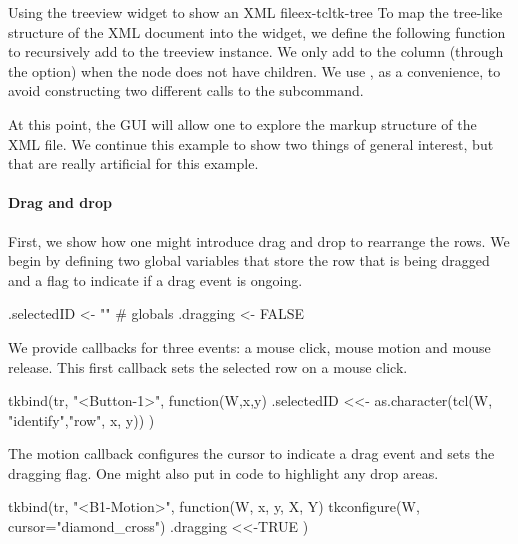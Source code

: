 \begin{example}{Using the treeview widget to show an XML file}{ex-tcltk-tree}
To map the tree-like structure of the XML document into the widget, we
define the following function to recursively add to the treeview
instance.  We only add to the  column (through the
 option) when the node does not have children. We use
, as a convenience, to avoid constructing two different
calls to the  subcommand. 
\begin{Schunk}
\end{Schunk}
%
At this point, the GUI will allow one to explore the markup structure of the
XML file. We continue this example to show two things of general
interest, but that are really artificial for this example.


\paragraph{Drag and drop}
First, we show how one might introduce drag and drop to rearrange the
rows. We begin by defining two global variables that store the row
that is being dragged  and a flag to indicate if a drag event is ongoing.
\begin{Schunk}
\begin{Sinput}
 .selectedID <- ""                               # globals
 .dragging <- FALSE
\end{Sinput}
\end{Schunk}
We provide callbacks for three events: a mouse click, mouse motion and mouse release.
This first callback sets the selected row on a mouse click.
\begin{Schunk}
\begin{Sinput}
 tkbind(tr, "<Button-1>", function(W,x,y) {
   .selectedID <<- as.character(tcl(W, "identify","row", x, y))
 })  
\end{Sinput}
\end{Schunk}
The motion callback configures the cursor to indicate a drag event and sets
the dragging flag. One might also put in code to highlight
any drop areas.
\begin{Schunk}
\begin{Sinput}
 tkbind(tr, "<B1-Motion>", function(W, x, y, X, Y) {
   tkconfigure(W, cursor="diamond_cross")
   .dragging <<-TRUE
 })
\end{Sinput}
\end{Schunk}


\end{example}
